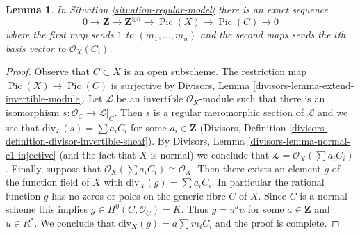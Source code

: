 \documentclass[10pt,a4paper]{amsart}
\theoremstyle{plain}
\newtheorem{lemma}[subsection]{Lemma}
\theoremstyle{definition}
\theoremstyle{remark}
\numberwithin{equation}{subsection}
\def\Pic{\mathop{\mathrm{Pic}}\nolimits}
\begin{document}
\begin{lemma}
\label{lemma-regular-model-pic}
In Situation \ref{situation-regular-model} there is an exact sequence
$$
0 \to \mathbf{Z} \to \mathbf{Z}^{\oplus n} \to
\Pic(X) \to \Pic(C) \to 0
$$
where the first map sends $1$ to $(m_1, \ldots, m_n)$ and the second
maps sends the $i$th basis vector to $\mathcal{O}_X(C_i)$.
\end{lemma}

\begin{proof}
Observe that $C \subset X$ is an open subscheme. The restriction
map $\Pic(X) \to \Pic(C)$ is surjective by
Divisors, Lemma \ref{divisors-lemma-extend-invertible-module}.
Let $\mathcal{L}$ be an invertible $\mathcal{O}_X$-module
such that there is an isomorphism $s : \mathcal{O}_C \to \mathcal{L}|_C$.
Then $s$ is a regular meromorphic section of $\mathcal{L}$
and we see that $\text{div}_\mathcal{L}(s) = \sum a_i C_i$
for some $a_i \in \mathbf{Z}$
(Divisors, Definition \ref{divisors-definition-divisor-invertible-sheaf}).
By Divisors, Lemma \ref{divisors-lemma-normal-c1-injective}
(and the fact that $X$ is normal)
we conclude that $\mathcal{L} = \mathcal{O}_X(\sum a_iC_i)$.
Finally, suppose that $\mathcal{O}_X(\sum a_i C_i) \cong \mathcal{O}_X$.
Then there exists an element $g$ of the function field of $X$
with $\text{div}_X(g) = \sum a_i C_i$. In particular the rational
function $g$ has no zeros or poles on the generic fibre $C$ of $X$.
Since $C$ is a normal scheme this implies $g \in H^0(C, \mathcal{O}_C) = K$.
Thus $g = \pi^a u$ for some $a \in \mathbf{Z}$ and $u \in R^*$.
We conclude that $\text{div}_X(g) = a \sum m_i C_i$ and the proof
is complete.
\end{proof}
\end{document}
